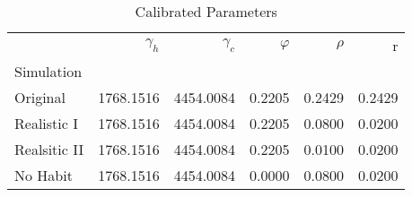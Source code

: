 \begin{table}
\centering
\caption{Calibrated Parameters}
\label{tab:calibs}
\begin{tabular}{lrrrrr}
\toprule
{} & $\gamma_h$ & $\gamma_c$ & $\varphi$ & $\rho$ &      r \\
Simulation   &            &            &           &        &        \\
\midrule
Original     &  1768.1516 &  4454.0084 &    0.2205 & 0.2429 & 0.2429 \\
Realistic I  &  1768.1516 &  4454.0084 &    0.2205 & 0.0800 & 0.0200 \\
Realsitic II &  1768.1516 &  4454.0084 &    0.2205 & 0.0100 & 0.0200 \\
No Habit     &  1768.1516 &  4454.0084 &    0.0000 & 0.0800 & 0.0200 \\
\bottomrule
\end{tabular}
\end{table}
